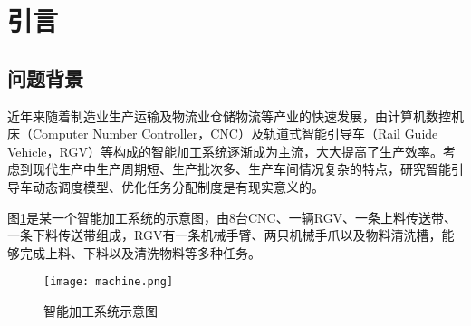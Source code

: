 \setcounter{section}{-1}
\section{引言}
	\subsection{问题背景}
		近年来随着制造业生产运输及物流业仓储物流等产业的快速发展，由计算机数控机床（Computer Number Controller，CNC）及轨道式智能引导车（Rail Guide Vehicle，RGV）等构成的智能加工系统逐渐成为主流，大大提高了生产效率。考虑到现代生产中生产周期短、生产批次多、生产车间情况复杂的特点，研究智能引导车动态调度模型、优化任务分配制度是有现实意义的。
		\par\indent 图\ref{智能加工系统示意图}是某一个智能加工系统的示意图，由8台CNC、一辆RGV、一条上料传送带、一条下料传送带组成，RGV有一条机械手臂、两只机械手爪以及物料清洗槽，能够完成上料、下料以及清洗物料等多种任务。
		\begin{figure}[htbp]
			\centering
			\caption{智能加工系统示意图}
			\label{智能加工系统示意图}
			\texttt{[image: machine.png]}
		\end{figure}
